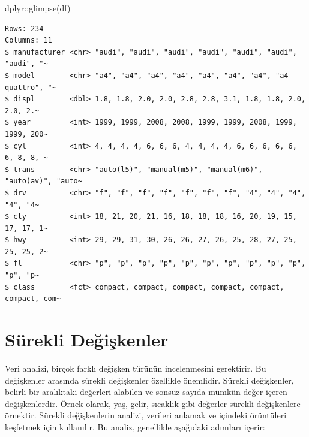 \documentclass[
  letterpaper,
  DIV=11,
  numbers=noendperiod]{scrreprt}
\newenvironment{Shaded}{\begin{snugshade}}{\end{snugshade}}
\newcommand{\FunctionTok}[1]{\textcolor[rgb]{0.28,0.35,0.67}{#1}}
\newcommand{\NormalTok}[1]{\textcolor[rgb]{0.00,0.23,0.31}{#1}}
\newcommand{\SpecialCharTok}[1]{\textcolor[rgb]{0.37,0.37,0.37}{#1}}
\begin{document}
\begin{Shaded}
\begin{Highlighting}[]
\NormalTok{dplyr}\SpecialCharTok{::}\FunctionTok{glimpse}\NormalTok{(df)}
\end{Highlighting}
\end{Shaded}

\begin{verbatim}
Rows: 234
Columns: 11
$ manufacturer <chr> "audi", "audi", "audi", "audi", "audi", "audi", "audi", "~
$ model        <chr> "a4", "a4", "a4", "a4", "a4", "a4", "a4", "a4 quattro", "~
$ displ        <dbl> 1.8, 1.8, 2.0, 2.0, 2.8, 2.8, 3.1, 1.8, 1.8, 2.0, 2.0, 2.~
$ year         <int> 1999, 1999, 2008, 2008, 1999, 1999, 2008, 1999, 1999, 200~
$ cyl          <int> 4, 4, 4, 4, 6, 6, 6, 4, 4, 4, 4, 6, 6, 6, 6, 6, 6, 8, 8, ~
$ trans        <chr> "auto(l5)", "manual(m5)", "manual(m6)", "auto(av)", "auto~
$ drv          <chr> "f", "f", "f", "f", "f", "f", "f", "4", "4", "4", "4", "4~
$ cty          <int> 18, 21, 20, 21, 16, 18, 18, 18, 16, 20, 19, 15, 17, 17, 1~
$ hwy          <int> 29, 29, 31, 30, 26, 26, 27, 26, 25, 28, 27, 25, 25, 25, 2~
$ fl           <chr> "p", "p", "p", "p", "p", "p", "p", "p", "p", "p", "p", "p~
$ class        <fct> compact, compact, compact, compact, compact, compact, com~
\end{verbatim}

\section*{Sürekli Değişkenler}\label{suxfcrekli-deux11fiux15fkenler}


Veri analizi, birçok farklı değişken türünün incelenmesini gerektirir.
Bu değişkenler arasında sürekli değişkenler özellikle önemlidir. Sürekli
değişkenler, belirli bir aralıktaki değerleri alabilen ve sonsuz sayıda
mümkün değer içeren değişkenlerdir. Örnek olarak, yaş, gelir, sıcaklık
gibi değerler sürekli değişkenlere örnektir. Sürekli değişkenlerin
analizi, verileri anlamak ve içindeki örüntüleri keşfetmek için
kullanılır. Bu analiz, genellikle aşağıdaki adımları içerir:
\end{document}
